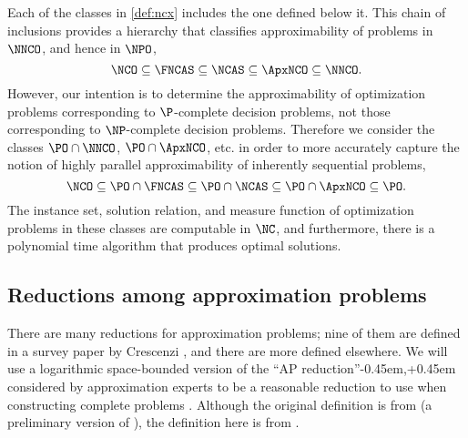 Each of the classes in \autoref{def:ncx} includes the one defined below it.
This chain of inclusions provides a hierarchy that classifies approximability of problems in $\NNCO$, and hence in $\NPO$,
$$
\NCO \subseteq \FNCAS \subseteq \NCAS \subseteq \ApxNCO \subseteq \NNCO.
$$
However, our intention is to determine the approximability of optimization problems corresponding to $\P$-complete decision problems, not those corresponding to $\NP$-complete decision problems.
Therefore we consider the classes $\PO \cap \NNCO$, $\PO \cap \ApxNCO$, etc. in order to more accurately capture the notion of highly parallel approximability of inherently sequential problems,
$$
\NCO \subseteq \PO \cap \FNCAS \subseteq \PO \cap \NCAS \subseteq \PO \cap \ApxNCO \subseteq \PO.
$$
The instance set, solution relation, and measure function of optimization problems in these classes are computable in $\NC$, and furthermore, there is a polynomial time algorithm that produces optimal solutions.

\subsection{Reductions among approximation problems}

There are many reductions for approximation problems; nine of them are defined in a survey paper by Crescenzi \cite{crescenzi97}, and there are more defined elsewhere.
We will use a logarithmic space-bounded version of the ``AP reduction''\kern-0.45em,\kern+0.45em considered by approximation experts to be a reasonable reduction to use when constructing complete problems \cite[Section~2]{crescenzi97} \cite[Section~8.6]{acgkmp99}.
Although the original definition is from \cite[Definition~9]{ckst95} (a preliminary version of \cite[Definition~2.5]{ckst99}), the definition here is from \cite[Definition~8.3]{acgkmp99}.

